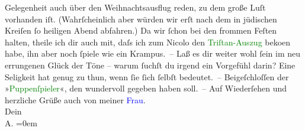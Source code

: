                Gelegenheit auch über den Weihnachtsausflug reden, zu dem große Luſt vorhanden iſt.
               (Wahrſcheinlich aber würden wir erſt nach dem in jüdischen Kreiſen ſo heiligen Abend
               abfahren.) Da wir ſchon bei den frommen Feſten halten, theile ich dir auch mit, daſs
               ich zum Nicolo den \textcolor{green}{Triſtan-Auszug}{}\ledrightnote{\textcolor{green}{Tristan und Isolde}} beko{\geminationm}en habe, ihn aber {\pb}noch ſpiele wie ein
               Krampus. –\pend
           \pstart
           Laß es dir weiter wohl ſein im neu errungenen Glück der Töne – warum ſuchſt du irgend
               ein Vorgefühl darin? Eine Seligkeit hat genug 
               zu thun, wenn ſie ſich ſelbſt bedeutet. – \pend
           \pstart
           Beigeſchloſſen der »\textcolor{green}{Puppenſpieler}{}\ledrightnote{\textcolor{green}{Der Puppenspieler}}«, den \label{K_L01475_2v}\label{K_L01475_2h} wundervoll gegeben haben soll. –\pend
           \pstart
           Auf Wiederſehen und herzliche Grüße {\pb}auch von meiner \textcolor{blue}{Frau}{}.{\\[\baselineskip]}Dein{\\[\baselineskip]}\spacefill\mbox{A.}\pend
           \leftskip=0em{}\endnumbering{}  
      
